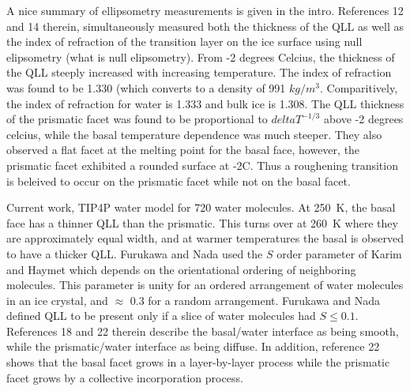 A nice summary of ellipsometry measurements is given in the
intro. References 12 and 14 therein, simultaneously measured both the
thickness of the QLL as well as the index of refraction of the
transition layer on the ice surface using null elipsometry (what is
null elipsometry). From -2 degrees Celcius, the thickness of the QLL
steeply increased with increasing temperature. The index of refraction
was found to be 1.330 (which converts to a density of 991
$kg/m^{3}$. Comparitively, the index of refraction for water is 1.333
and bulk ice is 1.308. The QLL thickness of the prismatic facet was
found to be proportional to $delta T ^{-1/3}$ above -2 degrees
celcius, while the basal temperature dependence was much steeper. They
also observed a flat facet at the melting point for the basal face,
however, the prismatic facet exhibited a rounded surface at -2C. Thus
a roughening transition is beleived to occur on the prismatic facet
while not on the basal facet.\cite{Furukawa1997} 

Current work, TIP4P water model for 720 water molecules. At 250~K, the
basal face has a thinner QLL than the prismatic. This turns over at
260~K where they are approximately equal width, and at warmer
temperatures the basal is observed to have a thicker QLL. Furukawa and
Nada used the $S$ order parameter of Karim and Haymet which depends on
the orientational ordering of neighboring molecules.\cite{Karim1988}
This parameter is unity for an ordered arrangement of water molecules
in an ice crystal, and $\approx$ 0.3 for a random
arrangement. Furukawa and Nada defined QLL to be present only if a
slice of water molecules had $S \le 0.1$. References 18 and 22 therein
describe the basal/water interface as being smooth, while the
prismatic/water interface as being diffuse. In addition, reference 22
shows that the basal facet grows in a layer-by-layer process while the
prismatic facet grows by a collective incorporation process. 



